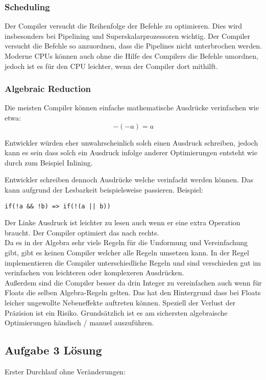 \documentclass{article}
\begin{document}
\subsubsection{Scheduling}
Der Compiler versucht die Reihenfolge der Befehle zu optimieren. Dies wird insbesonders bei Pipelining und Superskalarprozessoren wichtig. Der Compiler versucht die Befehle so anzuordnen, dass die Pipelines nicht unterbrochen werden. \\
Moderne CPUs können auch ohne die Hilfe des Compilers die Befehle umordnen, jedoch ist es für den CPU leichter, wenn der Compiler dort mithilft.

\subsubsection{Algebraic Reduction}
Die meisten Compiler können einfache mathematische Ausdrücke verinfachen wie etwa: \[
  -(-a) = a
\] 

Entwickler würden eher unwahrscheinlich solch einen Ausdruck schreiben, jedoch kann es sein dass solch ein Ausdruck infolge anderer Optimierungen entsteht wie durch zum Beispiel Inlining.

Entwickler schreiben dennoch Ausdrücke welche verinfacht werden können. Das kann aufgrund der Lesbarkeit beispielsweise passieren. Beispiel: \begin{verbatim}
if(!a && !b) => if(!(a || b)) 
\end{verbatim} 
Der Linke Ausdruck ist leichter zu lesen auch wenn er eine extra Operation braucht. 
Der Compiler optimiert das nach rechts. \\
Da es in der Algebra sehr viele Regeln für die Umformung und Vereinfachung gibt, gibt es keinen Compiler welcher alle Regeln umsetzen kann. In der Regel implementieren die Compiler unterschiedliche Regeln und sind verschieden gut im verinfachen von leichteren oder komplexeren Ausdrücken. \\
Außerdem sind die Compiler besser da drin Integer zu vereinfachen auch wenn für Floats die selben Algebra-Regeln gelten. Das hat den Hintergrund dass bei Floats leicher ungewollte Nebeneffekte auftreten können. Speziell der Verlust der Präzision ist ein Risiko.
Grundsätzlich ist es am sichersten algebraische Optimierungen händisch / manuel auszuführen.

\subsection{Aufgabe 3 Lösung}
Erster Durchlauf ohne Veränderungen:
\end{document}

